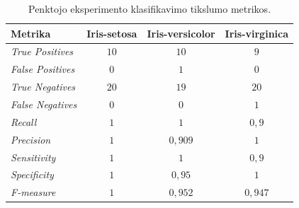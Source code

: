 \begin{table}[H]
    \centering
    \caption{Penktojo eksperimento klasifikavimo tikslumo metrikos.}
    \begin{tabular}{|l|c|c|c|}
        \hline
        \textbf{Metrika} & \textbf{Iris-setosa} & \textbf{Iris-versicolor} & \textbf{Iris-virginica} \\
        \hline
        \textit{True Positives}   & $10$  & $10$  & $9$ \\ \hline
        \textit{False Positives}  & $0$  & $1$   & $0$  \\ \hline
        \textit{True Negatives}   & $20$ & $19$  & $20$ \\ \hline
        \textit{False Negatives}  & $0$  & $0$   & $1$  \\ \hline
        \textit{Recall}           & $1$  & $1$       & $0{,}9$ \\ \hline
        \textit{Precision}        & $1$  & $0{,}909$ & $1$ \\ \hline
        \textit{Sensitivity}      & $1$  & $1$       & $0{,}9$ \\ \hline
        \textit{Specificity}      & $1$  & $0{,}95$ & $1$ \\ \hline
        \textit{F-measure}        & $1$  & $0{,}952$ & $0{,}947$ \\ \hline
    \end{tabular}
    \label{tab:eksperimento_nr_5_klasifikavimo_metrikos}
\end{table}